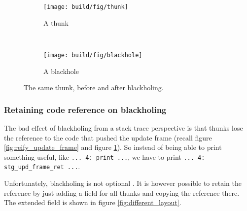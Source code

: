 \begin{figure}
\begin{mdframed}
  \begin{subfigure}[t]{0.5\textwidth}
    \texttt{[image: build/fig/thunk]}
    \caption{A thunk}
  \end{subfigure}
        ~ %
  \begin{subfigure}[t]{0.5\textwidth}
    \texttt{[image: build/fig/blackhole]}
    \caption{A blackhole}
  \end{subfigure}
  \caption{The same thunk, before and after blackholing.}\label{fig:thunks_and_blackholes}
\end{mdframed}
\end{figure}

\subsubsection{Retaining code reference on blackholing}

The bad effect of blackholing from a stack trace perspective is
that thunks lose the reference to the code that pushed the update frame (recall figure \ref{fig:reify_update_frame} and figure \ref{fig:thunks_and_blackholes}). So instead
of being able to print something useful, like  \texttt{... 4: print ...},
we have to print \texttt{... 4: stg\_upd\_frame\_ret ...}.

Unfortunately, blackholing is not optional
\cite{github_blackholing_not_optional}. It is however possible to
retain the reference by just adding a field for all thunks and
copying the reference there. The extended field is shown in figure
\ref{fig:different_layout}.

\begin{figure}
\end{figure}

